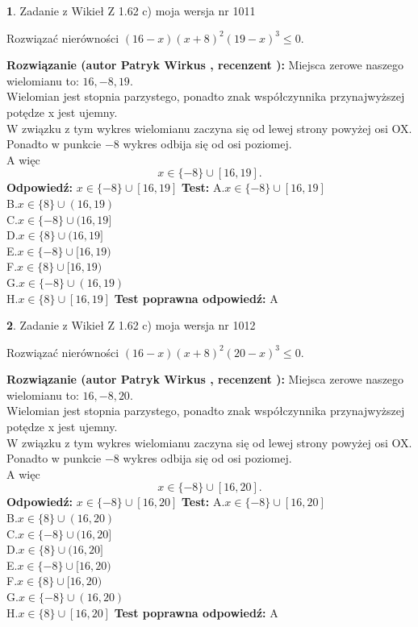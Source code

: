 \documentclass[12pt, a4paper]{article}
\theoremstyle{definition} %
\newtheorem{zad}{}
\newcommand{\zadStart}[1]{\begin{zad}#1\newline}
\newcommand{\zadStop}{\end{zad}}
\newcommand{\rozwStart}[2]{\noindent \textbf{Rozwiązanie (autor #1 , recenzent #2): }\newline}
\newcommand{\rozwStop}{\newline}
\newcommand{\odpStart}{\noindent \textbf{Odpowiedź:}\newline}
\newcommand{\odpStop}{\newline}
\newcommand{\testStart}{\noindent \textbf{Test:}\newline}
\newcommand{\testStop}{\newline}
\newcommand{\kluczStart}{\noindent \textbf{Test poprawna odpowiedź:}\newline}
\newcommand{\kluczStop}{\newline}
\begin{document}
\zadStart{Zadanie z Wikieł Z 1.62 c) moja wersja nr 1011}

Rozwiązać nierówności $(16-x)(x+8)^{2}(19-x)^{3}\le0$.
\zadStop
\rozwStart{Patryk Wirkus}{}
Miejsca zerowe naszego wielomianu to: $16, -8, 19$.\\
Wielomian jest stopnia parzystego, ponadto znak współczynnika przy\linebreak najwyższej potędze x jest ujemny.\\ W związku z tym wykres wielomianu zaczyna się od lewej strony powyżej osi OX.\\
Ponadto w punkcie $-8$ wykres odbija się od osi poziomej.\\
A więc $$x \in \{-8\} \cup [16,19].$$
\rozwStop
\odpStart
$x \in \{-8\} \cup [16,19]$
\odpStop
\testStart
A.$x \in \{-8\} \cup [16,19]$\\
B.$x \in \{8\} \cup (16,19)$\\
C.$x \in \{-8\} \cup (16,19]$\\
D.$x \in \{8\} \cup (16,19]$\\
E.$x \in \{-8\} \cup [16,19)$\\
F.$x \in \{8\} \cup [16,19)$\\
G.$x \in \{-8\} \cup (16,19)$\\
H.$x \in \{8\} \cup [16,19]$
\testStop
\kluczStart
A
\kluczStop



\zadStart{Zadanie z Wikieł Z 1.62 c) moja wersja nr 1012}

Rozwiązać nierówności $(16-x)(x+8)^{2}(20-x)^{3}\le0$.
\zadStop
\rozwStart{Patryk Wirkus}{}
Miejsca zerowe naszego wielomianu to: $16, -8, 20$.\\
Wielomian jest stopnia parzystego, ponadto znak współczynnika przy\linebreak najwyższej potędze x jest ujemny.\\ W związku z tym wykres wielomianu zaczyna się od lewej strony powyżej osi OX.\\
Ponadto w punkcie $-8$ wykres odbija się od osi poziomej.\\
A więc $$x \in \{-8\} \cup [16,20].$$
\rozwStop
\odpStart
$x \in \{-8\} \cup [16,20]$
\odpStop
\testStart
A.$x \in \{-8\} \cup [16,20]$\\
B.$x \in \{8\} \cup (16,20)$\\
C.$x \in \{-8\} \cup (16,20]$\\
D.$x \in \{8\} \cup (16,20]$\\
E.$x \in \{-8\} \cup [16,20)$\\
F.$x \in \{8\} \cup [16,20)$\\
G.$x \in \{-8\} \cup (16,20)$\\
H.$x \in \{8\} \cup [16,20]$
\testStop
\kluczStart
A
\kluczStop
\end{document}

